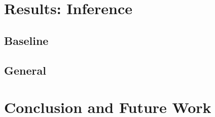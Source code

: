 \documentclass{article}
\begin{document}

\section{Results: Inference}
\label{sec:results-inference}
\subsection{Baseline}
\subsection{General}


\section{Conclusion and Future Work}
\label{sec:conclusion}








\end{document}

